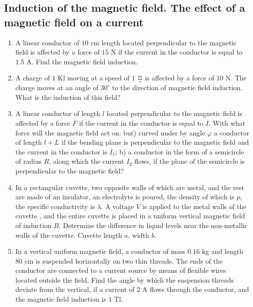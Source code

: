 \documentclass{article}
\begin{document}
\subsection{Induction of the magnetic field. The effect of a magnetic field on a current}

\begin{enumerate}[label=9.1.\arabic*]

\item A linear conductor of $10$ cm length located perpendicular to the magnetic field is affected by a force of $15$ N if the current in the conductor is equal to $1.5$ A. Find the magnetic field induction.

\item A charge of $1$ Kl moving at a speed of $1$ $\frac{m}{s}$ is affected by a force of $10$ N. The charge moves at an angle of $30^\circ$ to the direction of magnetic field induction. What is the induction of this field?

\item A linear conductor of length $l$ located perpendicular to the magnetic field is affected by a force $F$ if the current in the conductor is equal to $I$. With what force will the magnetic field act on: but) curved under by angle $\varphi$ a conductor of length $l + L$ if the bending plane is perpendicular to the magnetic field and the current in the conductor is $I_1$; b) a conductor in the form of a semicircle of radius $R$, along which the current $I_2$ flows, if the plane of the semicircle is perpendicular to the magnetic field?

\item In a rectangular cuvette, two opposite walls of which are metal, and the rest are made of an insulator, an electrolyte is poured, the density of which is $\rho$, the specific conductivity is $\lambda$. A voltage $V$ is applied to the metal walls of the cuvette , and the entire cuvette is placed in a uniform vertical magnetic field of induction $B$. Determine the difference in liquid levels near the non-metallic walls of the cuvette. Cuvette length $a$, width $b$. 

\item In a vertical uniform magnetic field, a conductor of mass $0.16$ kg and length $80$ cm is suspended horizontally on two thin threads. The ends of the conductor are connected to a current source by means of flexible wires located outside the field. Find the angle by which the suspension threads deviate from the vertical, if a current of $2$ A flows through the conductor, and the magnetic field induction is $1$ Tl.


\end{enumerate}
\end{document}
